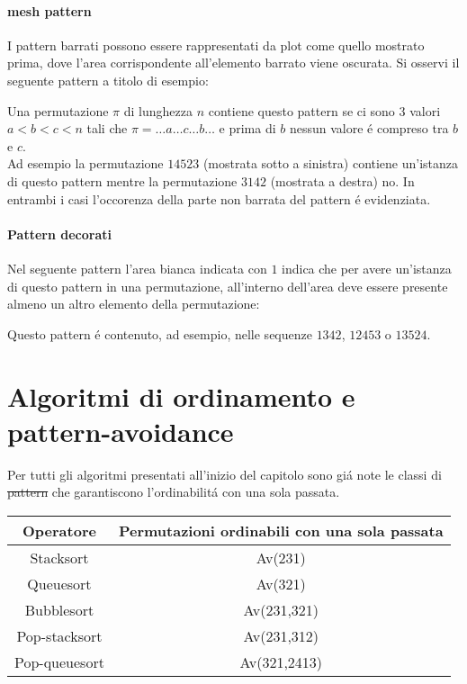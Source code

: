 \paragraph*{mesh pattern} I pattern barrati possono essere rappresentati da plot come quello mostrato prima, dove l'area corrispondente all'elemento barrato viene oscurata. Si osservi il seguente pattern a titolo di esempio:
\begin{center}\end{center}
Una permutazione $\pi$ di lunghezza $n$ contiene questo pattern se ci sono 3 valori $a<b<c<n$ tali che $\pi=\dots{a}\dots{c}\dots{b}\dots$ e prima di $b$ nessun valore \'e compreso tra $b$ e $c$.\\
Ad esempio la permutazione $14523$ (mostrata sotto a sinistra) contiene un'istanza di questo pattern mentre la permutazione $3142$ (mostrata a destra) no. In entrambi i casi l'occorenza della parte non barrata del pattern \'e evidenziata.
\begin{center}
\end{center}
\paragraph*{Pattern decorati}Nel seguente pattern l'area bianca indicata con $1$ indica che per avere un'istanza di questo pattern in una permutazione, all'interno dell'area deve essere presente almeno un altro elemento della permutazione: 
\begin{center}
\end{center}
Questo pattern \'e contenuto, ad esempio, nelle sequenze $1342$, $12453$ o $13524$.
\section*{Algoritmi di ordinamento e pattern-avoidance}
Per tutti gli algoritmi presentati all'inizio del capitolo 
sono gi\'a note le classi di \st{pattern} che garantiscono l'ordinabilit\'a con una sola passata. 
\begin{center}
\begin{tabular}{ |c|c| } 
\hline
\textbf{Operatore} & \textbf{Permutazioni ordinabili con una sola passata} \\ 
\hline
Stacksort\cite{limbrief} & Av(231)\\ 
Queuesort\cite{cioni2021preimages} & Av(321)\\ 
Bubblesort\cite{albert2010inverse} & Av(231,321)\\ 
Pop-stacksort\cite{magnusson2013sorting} & Av(231,312)\\ 
Pop-queuesort\cite{cioni2021sorting}& Av(321,2413)\\ 
\hline
\end{tabular}
\end{center}